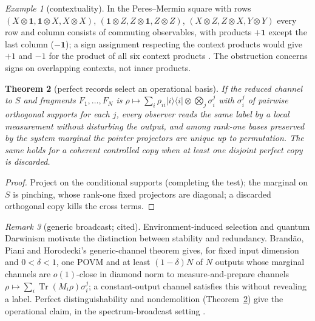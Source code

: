 \documentclass[aps,pra,onecolumn,superscriptaddress,nofootinbib,10pt]{revtex4-2}
\newtheorem{theorem}{Theorem}
\theoremstyle{definition}
\theoremstyle{remark}
\newtheorem{remark}[theorem]{Remark}
\newtheorem{example}[theorem]{Example}
\newcommand{\tr}{\operatorname{Tr}}
\begin{document}
\begin{example}[contextuality]\label{ex:fmcontext}
In the Peres--Mermin square with rows $(X\otimes\mathbf1,\mathbf1\otimes X,X\otimes X)$, $(\mathbf1\otimes Z,Z\otimes\mathbf1,Z\otimes Z)$, $(X\otimes Z,Z\otimes X,Y\otimes Y)$ every row and
column consists of commuting observables, with products $+\mathbf1$ except the last column ($-\mathbf1$); a sign assignment
respecting the context products would give $+1$ and $-1$ for the product of all six context products
\cite{n2-peres,n2-mermin}.  The obstruction concerns signs on overlapping contexts, not inner products.
\end{example}

\begin{theorem}[perfect records select an operational basis]\label{thm:fmpointer}
If the reduced channel to $S$ and fragments $F_1,\dots,F_N$ is $\rho\mapsto\sum_i\rho_{ii}\lvert i\rangle\langle i\rvert\otimes\bigotimes_j\sigma_i^j$ with $\sigma_i^j$ of pairwise
orthogonal supports for each $j$, every observer reads the same label by a local measurement without
disturbing the output, and among rank-one bases preserved by the system marginal the pointer projectors
are unique up to permutation.  The same holds for a coherent controlled copy when at least one disjoint
perfect copy is discarded.
\end{theorem}
\begin{proof}
Project on the conditional supports (completing the test); the marginal on $S$ is pinching, whose rank-one
fixed projectors are diagonal; a discarded orthogonal copy kills the cross terms.
\end{proof}

\begin{remark}[generic broadcast; cited]\label{rem:fmbph}
Environment-induced selection and quantum Darwinism \cite{n2-zurek81,n2-zurek09,n2-blumekohout}
motivate the distinction between stability and redundancy.  Brand\~ao, Piani and Horodecki's
generic-channel theorem \cite[Thm.~1]{n2-bph} gives, for fixed input dimension and $0<\delta<1$, one POVM and at
least $(1-\delta)N$ of $N$ outputs whose marginal channels are $o(1)$-close in diamond norm to measure-and-prepare channels
$\rho\mapsto\sum_i\tr(M_i\rho)\sigma_i^j$; a constant-output channel satisfies this without revealing a label.  Perfect distinguishability
and nondemolition (Theorem~\ref{thm:fmpointer}) give the operational claim, in the spectrum-broadcast setting
\cite{n2-horodecki}.
\end{remark}
\end{document}
